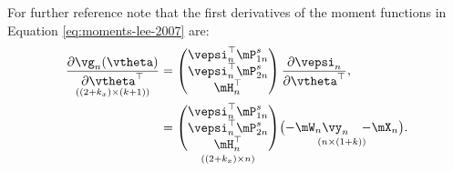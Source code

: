 \documentclass[english,12pt]{book}\usepackage[]{graphicx}\usepackage[]{xcolor}
\begin{document}
For further reference note that the first derivatives of the moment functions in Equation \eqref{eq:moments-lee-2007} are:
\begin{equation}\label{eq:Jacobian-gmm-slm}
\begin{aligned}
\underset{((2 + k_x) \times (k + 1))}{\frac{\partial \vg_n(\vtheta)}{\partial \vtheta^\top}} & = \begin{pmatrix}
                                                      \vepsi_n^\top\mP_{1n}^s \\
                                                      \vepsi_n^\top\mP_{2n}^s \\
                                                      \mH_n^\top
                                                      \end{pmatrix}
                                                      \frac{\partial \vepsi_n}{\partial \vtheta^\top}, \\
                                                & =  \underset{((2 + k_x)\times n)}{\begin{pmatrix}
                                                      \vepsi_n^\top\mP_{1n}^s \\
                                                      \vepsi_n^\top\mP_{2n}^s \\
                                                      \mH_n^\top
                                                      \end{pmatrix}}
                                                    \underset{(n\times(1 + k))}{\begin{pmatrix}
                                                      -\mW_n\vy_n & -\mX_n
                                                    \end{pmatrix}}.
\end{aligned}
\end{equation}
\end{document}

